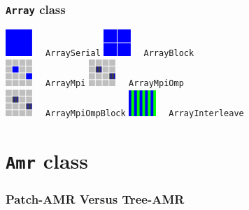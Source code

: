 \documentclass{beamer}
\newcommand{\code}[1]{\texttt{#1}}
\begin{document}
\begin{frame}
\frametitle{\code{Array} class}

 \includegraphics[width=0.4in]{array-serial.eps} \ \ \code{ArraySerial} 
 \includegraphics[width=0.4in]{array-block.eps} \ \ \code{ArrayBlock} \\
 \includegraphics[width=0.4in]{array-mpi.eps} \ \ \code{ArrayMpi} 
 \includegraphics[width=0.4in]{array-mpi-omp.eps} \ \ \code{ArrayMpiOmp} \\
 \includegraphics[width=0.4in]{array-mpi-omp-block.eps} \ \ \code{ArrayMpiOmpBlock} 
 \includegraphics[width=0.4in]{array-interleave.eps} \ \ \code{ArrayInterleave} 

\end{frame}

\section{\code{Amr} class}

\begin{frame}
\frametitle{Patch-AMR Versus Tree-AMR}

\end{frame}



\begin{frame}
\frametitle{}

\end{frame}

\begin{frame}
\frametitle{}

\end{frame}
\end{document}
